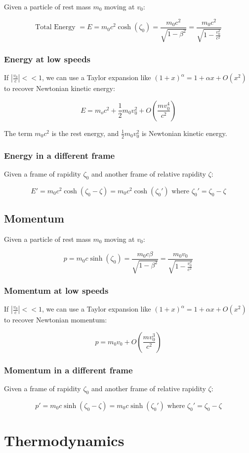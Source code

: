 \documentclass[12pt]{article}
\begin{document}
Given a particle of rest mass $m_0$ moving at $v_0$:

\[
\boxed{
\text{Total Energy } = E = m_0 c^2 \cosh(\zeta_0) = \frac{m_0 c^2}{\sqrt{1 - \beta^2}} = \frac{m_0 c^2}{\sqrt{1 - \frac{v_0^2}{c^2}}}
}
\]

\subsubsection{Energy at low speeds}

If $\left|\frac{v_0}{c}\right| << 1$, we can use a Taylor expansion like $(1 + x)^\alpha = 1 + \alpha x + O(x^2)$ to recover Newtonian kinetic energy:

\[
\boxed{
E = m_o c^2 + \frac{1}{2}m_0 v_0^2 + O\left(\frac{mv_0^4}{c^2}\right)
}
\]

The term $m_0 c^2$ is the rest energy, and $\frac{1}{2}m_0v_0^2$ is Newtonian kinetic energy.

\subsubsection{Energy in a different frame}

Given a frame of rapidity $\zeta_0$ and another frame of relative rapidity $\zeta$:

\[
\boxed{
E' = m_0 c^2 \cosh(\zeta_0 - \zeta) = m_0 c^2 \cosh(\zeta_0')}\text{ where } \zeta_0' = \zeta_0 - \zeta
\]

\subsection{Momentum}

Given a particle of rest mass $m_0$ moving at $v_0$:

\[
\boxed{
p = m_0 c \sinh(\zeta_0) = \frac{m_0 c \beta}{\sqrt{1 - \beta^2}} = \frac{m_0 v_0}{\sqrt{1 - \frac{v_0^2}{c^2}}}
}
\]

\subsubsection{Momentum at low speeds}

If $\left|\frac{v_0}{c}\right| << 1$, we can use a Taylor expansion like $(1 + x)^\alpha = 1 + \alpha x + O(x^2)$ to recover Newtonian momentum:

\[
\boxed{
p = m_0v_0 + O\left(\frac{mv_0^3}{c^2}\right)
}
\]

\subsubsection{Momentum in a different frame}

Given a frame of rapidity $\zeta_0$ and another frame of relative rapidity $\zeta$:

\[
\boxed{
p' = m_0 c \sinh(\zeta_0 - \zeta) = m_0 c \sinh(\zeta_0')}\text{ where } \zeta_0' = \zeta_0 - \zeta
\]

\newpage

\section{Thermodynamics}
\end{document}

